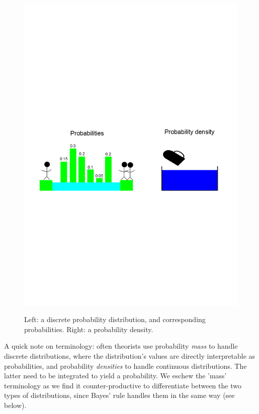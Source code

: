 \documentclass[11pt,fullpage]{book}
\begin{document}
\begin{figure}
\centering
\scalebox{0.6} 
{\includegraphics{Probability_steppingStones.png}}
\caption{Left: a discrete probability distribution, and corresponding probabilities. Right: a probability density.}\label{fig:Probability_steppingStones}
\end{figure}

A quick note on terminology: often theorists use probability \textit{mass} to handle discrete distributions, where the distribution's values are directly interpretable as probabilities, and probability \textit{densities} to handle continuous distributions. The latter need to be integrated to yield a probability. We eschew the 'mass' terminology as we find it counter-productive to differentiate between the two types of distributions, since Bayes' rule handles them in the same way (see below).
\end{document}

